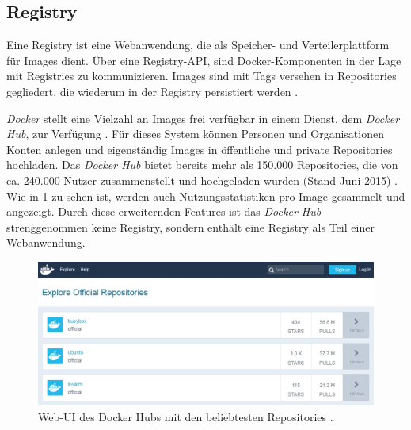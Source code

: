 \documentclass[../main.tex]{subfiles}
\begin{document}

		\subsection{Registry}
		\label{dockerRegistries}
      Eine Registry ist eine Webanwendung, die als Speicher- und Verteilerplattform für Images dient. Über eine Registry-API, sind Docker-Komponenten in der Lage mit Registries zu kommunizieren. Images sind mit Tags versehen in Repositories gegliedert, die wiederum in der Registry persistiert werden \cite{dockerRegistry}. %

      \emph{Docker} stellt eine Vielzahl an Images frei verfügbar in einem Dienst, dem \emph{Docker Hub}, zur Verfügung \cite[S.11]{dockerBook}\cite[S.3]{dockerSec1}\cite{dockerRegistry}. Für dieses System können Personen und Organisationen Konten anlegen und eigenständig Images in öffentliche und private Repositories hochladen. Das \emph{Docker Hub} bietet bereits mehr als 150.000 Repositories, die von ca. 240.000 Nutzer zusammenstellt und hochgeladen wurden (Stand Juni 2015) \cite[S.16]{slideshareDockercon15}. Wie in \fig \ref{fig:intro_registry} zu sehen ist, werden auch Nutzungsstatistiken pro Image gesammelt und angezeigt. Durch diese erweiternden Features ist das \emph{Docker Hub} strenggenommen keine Registry, sondern enthält eine Registry als Teil einer Webanwendung. %

      \begin{figure}[h]
          \centering
          \includegraphics[width=1.0\textwidth]{./images/intro_registry.jpg}
          \caption{Web-\acrshort{UI} des Docker Hubs mit den beliebtesten Repositories \cite{dockerHub}.}
          \label{fig:intro_registry}
      \end{figure}
\end{document}
